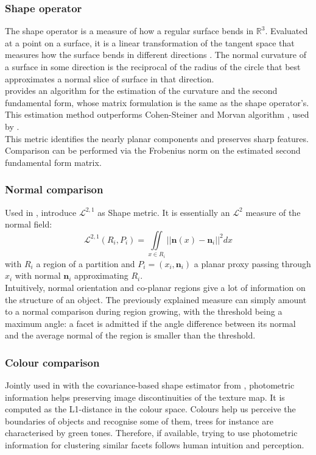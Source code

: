 \documentclass{kththesis}
\begin{document}
\subsubsection{Shape operator}
The shape operator is a measure of how a regular surface bends in $\mathbb{R}^3$. Evaluated at a point on a surface, it is a linear transformation of the tangent space that measures how the surface bends in different directions \parencite{ShapeOpBook}. The normal curvature of a surface in some direction
is the reciprocal of the radius of the circle that best approximates
a normal slice of surface in that direction. \\
\textcite{curvPaper} provides an algorithm for the estimation of the curvature and the second fundamental form, whose matrix formulation is the same as the shape operator's. This estimation method outperforms Cohen-Steiner and Morvan algorithm \parencite{CohenSteiner:2003}, used by \textcite{verdie}. \\
This metric identifies the nearly planar components and preserves sharp features. Comparison can be performed via the Frobenius norm on the estimated second fundamental form matrix. 
\subsubsection{Normal comparison}
Used in \textcite{rouhani}, \textcite{CohenSteiner:2004} introduce $\mathcal{L}^{2,1}$ as Shape metric. It is essentially an $\mathcal{L}^2$ measure of the normal field: 
$$\mathcal{L}^{2,1}(R_i, P_i)= \iint \limits_{x \in R_i} ||\mathbf{n}(x) - \mathbf{n}_i||^2dx$$
with $R_i$ a region of a partition and $P_i=(x_i, \mathbf{n}_i)$ a planar proxy passing through $x_i$ with normal $\mathbf{n}_i$ approximating $R_i$. \\

Intuitively, normal orientation and co-planar regions give a lot of information on the structure of an object. The previously explained measure can simply amount to a normal comparison during region growing, with the threshold being a maximum angle: a facet is admitted if the angle difference between its normal and the average normal of the region is smaller than the threshold. 
\subsubsection{Colour comparison}
Jointly used in \textcite{rouhani} with the covariance-based shape estimator from \textcite{CohenSteiner:2004}, photometric information helps preserving image discontinuities of the texture map. It is computed as the L1-distance in the colour space. Colours help us perceive the boundaries of objects and recognise some of them, trees for instance are characterised by green tones. Therefore, if available, trying to use photometric information for clustering similar facets follows human intuition and perception. 
\end{document}

